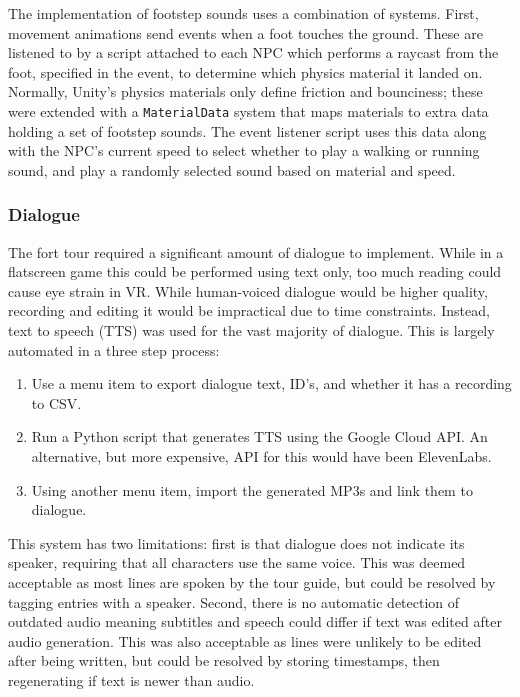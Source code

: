 \documentclass[sigconf]{acmart}
\begin{document}
The implementation of footstep sounds uses a combination of systems. First,
movement animations send events when a foot touches the ground. These are listened
to by a script attached to each NPC which performs a raycast from the
foot, specified in the event, to determine which physics material it landed on.
Normally, Unity's physics materials only define friction and bounciness; these were
extended with a \texttt{MaterialData} system that maps materials to extra data
holding a set of footstep sounds. The event listener script uses this data along
with the NPC's current speed to select whether to play a walking or running sound,
and play a randomly selected sound based on material and speed.

\subsubsection{Dialogue}

The fort tour required a significant amount of dialogue to implement. While in
a flatscreen game this could be performed using text only, too much reading could
cause eye strain in VR. While human-voiced dialogue would be higher quality, recording
and editing it would be impractical due to time constraints. Instead, text to
speech (TTS) was used for the vast majority of dialogue. This is largely automated
in a three step process:

\begin{enumerate}
  \item Use a menu item to export dialogue text, ID's, and whether it has a recording to CSV.
  \item Run a Python script that generates TTS using the Google Cloud API.
        An alternative, but more expensive, API for this would have been ElevenLabs.
  \item Using another menu item, import the generated MP3s and link them to dialogue.
\end{enumerate}

This system has two limitations: first is that dialogue does not indicate its speaker,
requiring that all characters use the same voice. This was deemed acceptable as
most lines are spoken by the tour guide, but could be resolved by tagging entries
with a speaker. Second, there is no automatic detection of outdated audio
meaning subtitles and speech could differ if text was edited after audio generation.
This was also acceptable as lines were unlikely to be edited after being written, but
could be resolved by storing timestamps, then regenerating
if text is newer than audio.
\end{document}

